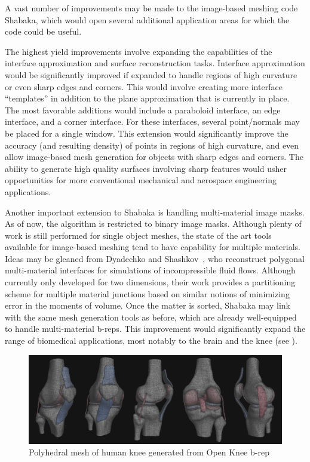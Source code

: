 A vast number of improvements may be made to the image-based meshing code Shabaka, which would open several additional application areas for which the code could be useful.

The highest yield improvements involve expanding the capabilities of the interface approximation and surface reconstruction tasks. Interface approximation would be significantly improved if expanded to handle regions of high curvature or even sharp edges and corners. This would involve creating more interface ``templates'' in addition to the plane approximation that is currently in place. The most favorable additions would include a paraboloid interface, an edge interface, and a corner interface. For these interfaces, several point/normals may be placed for a single window. This extension would significantly improve the accuracy (and resulting density) of points in regions of high curvature, and even allow image-based mesh generation for objects with sharp edges and corners. The ability to generate high quality surfaces involving sharp features would usher opportunities for more conventional mechanical and aerospace engineering applications.

Another important extension to Shabaka is handling multi-material image masks. As of now, the algorithm is restricted to binary image masks. Although plenty of work is still performed for single object meshes, the state of the art tools available for image-based meshing tend to have capability for multiple materials. Ideas may be gleaned from Dyadechko and Shashkov~\cite{dyadechko_2008}, who reconstruct polygonal multi-material interfaces for simulations of incompressible fluid flows. Although currently only developed for two dimensions, their work provides a partitioning scheme for multiple material junctions based on similar notions of minimizing error in the moments of volume. Once the matter is sorted, Shabaka may link with the same mesh generation tools as before, which are already well-equipped to handle multi-material b-reps. This improvement would significantly expand the range of biomedical applications, most notably to the brain and the knee (see ).

\begin{figure}
\centering
		\includegraphics[width=1.0\textwidth]{media/7-polyknee/fullmesh.png}
%
\caption{Polyhedral mesh of human knee generated from Open Knee b-rep~\cite{erdemir_2015}}
\label{fig:polyknee}
\end{figure}

